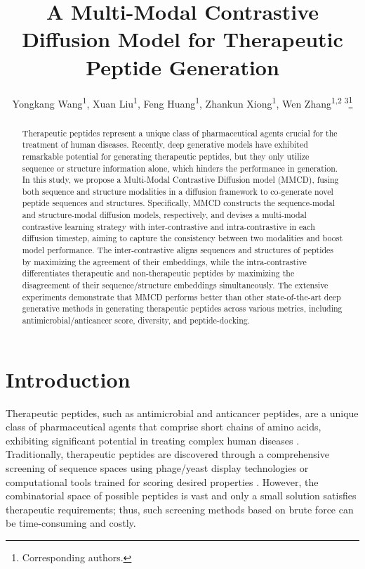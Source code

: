 \documentclass[letterpaper]{article} %
\title{A Multi-Modal Contrastive Diffusion Model for Therapeutic Peptide Generation}
\author {
    Yongkang Wang\textsuperscript{\rm 1}\equalcontrib ,
    Xuan Liu\textsuperscript{\rm 1}\equalcontrib ,
    Feng Huang\textsuperscript{\rm 1},
    Zhankun Xiong\textsuperscript{\rm 1},
    Wen Zhang\textsuperscript{\rm 1,\rm 2 \rm 3}\thanks{Corresponding authors.}
}
\begin{document}
\maketitle
\begin{abstract}
Therapeutic peptides represent a unique class of pharmaceutical agents crucial for the treatment of human diseases. Recently, deep generative models have exhibited remarkable potential for generating therapeutic peptides, but they only utilize sequence or structure information alone, which hinders the performance in generation. In this study, we propose a Multi-Modal Contrastive Diffusion model (MMCD), fusing both sequence and structure modalities in a diffusion framework to co-generate novel peptide sequences and structures. Specifically, MMCD constructs the sequence-modal and structure-modal diffusion models, respectively, and devises a multi-modal contrastive learning strategy with inter-contrastive and intra-contrastive in each diffusion timestep, aiming to capture the consistency between two modalities and boost model performance. The inter-contrastive aligns sequences and structures of peptides by maximizing the agreement of their embeddings, while the intra-contrastive differentiates therapeutic and non-therapeutic peptides by maximizing the disagreement of their sequence/structure embeddings simultaneously. The extensive experiments demonstrate that MMCD performs better than other state-of-the-art deep generative methods in generating therapeutic peptides across various metrics, including antimicrobial/anticancer score, diversity, and peptide-docking.
\end{abstract}

\section{Introduction}
Therapeutic peptides, such as antimicrobial and anticancer peptides, are a unique class of pharmaceutical agents that comprise short chains of amino acids, exhibiting significant potential in treating complex human diseases \cite{jakubczykCurrentTrends2020}. Traditionally, therapeutic peptides are discovered through a comprehensive screening of sequence spaces using phage/yeast display technologies \cite{muttenthaler2021trends} or computational tools trained for scoring desired properties \cite{leeWhatCan2017, leeMachineLearningenabled2018}. However, the combinatorial space of possible peptides is vast and only a small solution satisfies therapeutic requirements; thus, such screening methods based on brute force can be time-consuming and costly.
\end{document}
